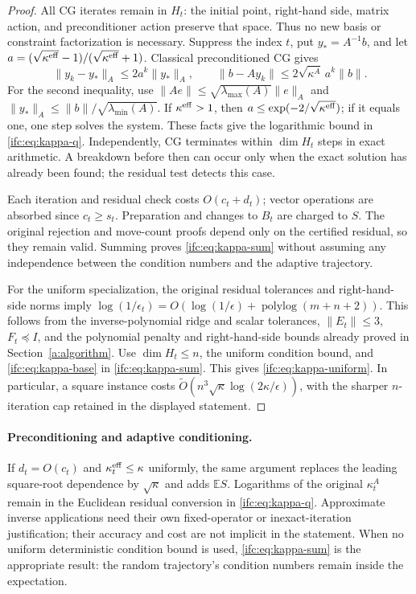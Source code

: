 \documentclass[11pt]{amsart}
\theoremstyle{definition}\newtheorem{definition}[theorem]{Definition}
\theoremstyle{remark}\newtheorem{remark}[theorem]{Remark}
\numberwithin{equation}{section}
\begin{document}
\begin{proof}
All CG iterates remain in $H_t$: the initial point, right-hand side,
matrix action, and preconditioner action preserve that space. Thus no
new basis or constraint factorization is necessary. Suppress the index
$t$, put $y_*=A^{-1}b$, and let
$a=(\sqrt{\kappa^{\rm eff}}-1)/(\sqrt{\kappa^{\rm eff}}+1)$.
Classical preconditioned CG gives
\[
 \|y_k-y_*\|_A\le2a^k\|y_*\|_A,
 \qquad
 \|b-Ay_k\|\le2\sqrt{\kappa^A}\,a^k\|b\|.
\]
For the second inequality, use
$\|Ae\|\le\sqrt{\lambda_{\max}(A)}\|e\|_A$ and
$\|y_*\|_A\le\|b\|/\sqrt{\lambda_{\min}(A)}$.
If $\kappa^{\rm eff}>1$, then
$a\le\exp(-2/\sqrt{\kappa^{\rm eff}})$; if it equals one, one step
solves the system. These facts give the logarithmic bound in
\eqref{ifc:eq:kappa-q}. Independently, CG terminates within $\dim H_t$
steps in exact arithmetic. A breakdown before then can occur only when the exact solution has
already been found; the residual test detects this case.

Each iteration and residual check costs $O(c_t+d_t)$; vector operations
are absorbed since $c_t\ge s_t$. Preparation and changes to $B_t$ are
charged to $S$. The original rejection and move-count proofs depend only
on the certified residual, so they remain valid. Summing proves
\eqref{ifc:eq:kappa-sum} without assuming any independence between the
condition numbers and the adaptive trajectory.

For the uniform specialization, the original residual tolerances and
right-hand-side norms imply
$\log(1/\epsilon_t)=O(\log(1/\epsilon)+\operatorname{polylog}(m+n+2))$.
This follows from the inverse-polynomial ridge and scalar tolerances,
$\|E_t\|\le3$, $F_t\preceq I$, and the polynomial penalty and
right-hand-side bounds already proved in Section~\ref{a:algorithm}.
Use $\dim H_t\le n$, the uniform condition bound, and
\eqref{ifc:eq:kappa-base} in \eqref{ifc:eq:kappa-sum}. This gives
\eqref{ifc:eq:kappa-uniform}. In particular, a square instance costs
$\widetilde O(n^3\sqrt\kappa\log(2\kappa/\epsilon))$, with the sharper
$n$-iteration cap retained in the displayed statement.
\end{proof}

\paragraph{Preconditioning and adaptive conditioning.}
If $d_t=O(c_t)$ and $\kappa_t^{\rm eff}\le\kappa$ uniformly, the same
argument replaces the leading square-root dependence by
$\sqrt\kappa$ and adds $\mathbb ES$. Logarithms of the original
$\kappa_t^A$ remain in the Euclidean residual conversion in
\eqref{ifc:eq:kappa-q}. Approximate inverse applications need their own
fixed-operator or inexact-iteration justification; their accuracy and
cost are not implicit in the statement. When no uniform deterministic
condition bound is used, \eqref{ifc:eq:kappa-sum} is the appropriate result:
the random trajectory's condition numbers remain inside the expectation.
\end{document}
